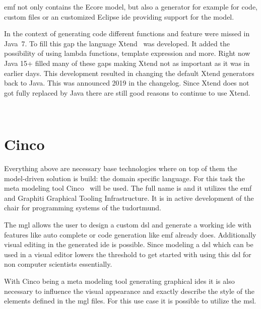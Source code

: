 \gls{emf} not only contains the Ecore model, but also a generator for example for code, custom files or an customized Eclipse \gls{ide} providing support for the model.

In the context of generating code different functions and feature were missed in Java~7. To fill this gap the language Xtend~\cite{xtendhp} was developed. It added the possibility of using lambda functions,  template expression and more. Right now Java 15+ filled many of these gaps making Xtend not as important as it was in earlier days. This development resulted in changing the default Xtend generators back to Java. This was announced 2019 in the changelog. Since Xtend does not got fully replaced by Java there are still good reasons to continue to use Xtend.

~\cite{xtendToJava}


\section{Cinco}
Everything above are necessary base technologies where on top of them the model-driven solution  is build: the domain specific language. For this task the meta modeling tool Cinco~\cite{CincoHomepage} will be used. The full name is  and it utilizes the \gls{emf} and Graphiti Graphical Tooling Infrastructure. It is in active development of the chair for programming systems of the \gls{tudortmund}.

The \gls{mgl} allows the user to design a custom \gls{dsl} and generate a working \gls{ide} with features like auto complete or code generation like \gls{emf} already does. Additionally visual editing in the generated \gls{ide} is possible. Since modeling a \gls{dsl} which can be used in a visual editor lowers the threshold to get started with using this \gls{dsl} for non computer scientists essentially. 

With Cinco being a meta modeling tool generating graphical \glspl{ide} it is also necessary to influence the visual appearance and exactly describe the style of the elements defined in the \gls{mgl} files. For this use case it is possible to utilize the \gls{msl}.

